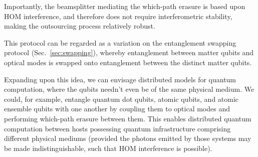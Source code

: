 \documentclass[aps, rmp, twocolumn, amsmath, amssymb, nofootinbib, superscriptaddress, longbibliography, floatfix, table-of-contents, eqsecnum]{revtex4-1}
\begin{document}
Importantly, the beamsplitter mediating the which-path erasure is based upon HOM interference, and therefore does not require interferometric stability, making the outsourcing process relatively robust.

This protocol can be regarded as a variation on the entanglement swapping protocol (Sec.~\ref{sec:swapping}), whereby entanglement between matter qubits and optical modes is swapped onto entanglement between the distinct matter qubits.

Expanding upon this idea, we can envisage distributed models for quantum computation, where the qubits needn't even be of the same physical medium. We could, for example, entangle quantum dot qubits, atomic qubits, and atomic ensemble qubits with one another by coupling them to optical modes and performing which-path erasure between them. This enables distributed quantum computation between hosts possessing quantum infrastructure comprising different physical mediums (provided the photons emitted by those systems may be made indistinguishable, such that HOM interference is possible).
\end{document}
